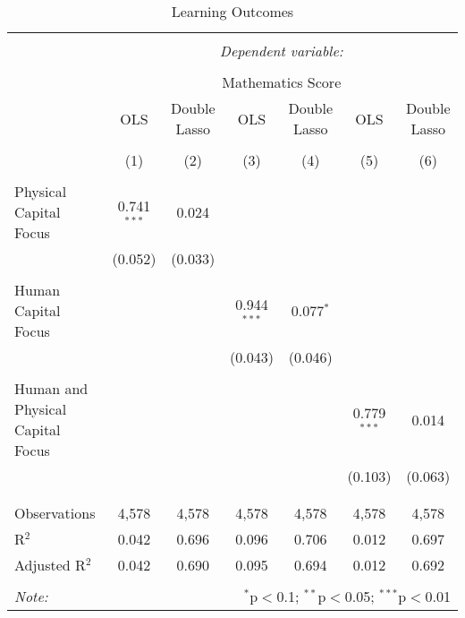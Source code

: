 
\begin{table}[!htbp] \centering 
  \caption{Learning Outcomes} 
  \label{} 
\begin{tabular}{@{\extracolsep{5pt}}lcccccc} 
\\[-1.8ex]\hline 
\hline \\[-1.8ex] 
 & \multicolumn{6}{c}{\textit{Dependent variable:}} \\ 
\cline{2-7} 
\\[-1.8ex] & \multicolumn{6}{c}{Mathematics Score} \\ 
 & OLS & Double Lasso & OLS & Double Lasso & OLS & Double Lasso \\ 
\\[-1.8ex] & (1) & (2) & (3) & (4) & (5) & (6)\\ 
\hline \\[-1.8ex] 
 Physical Capital Focus & 0.741$^{***}$ & 0.024 &  &  &  &  \\ 
  & (0.052) & (0.033) &  &  &  &  \\ 
  & & & & & & \\ 
 Human Capital Focus &  &  & 0.944$^{***}$ & 0.077$^{*}$ &  &  \\ 
  &  &  & (0.043) & (0.046) &  &  \\ 
  & & & & & & \\ 
 Human and Physical Capital Focus &  &  &  &  & 0.779$^{***}$ & 0.014 \\ 
  &  &  &  &  & (0.103) & (0.063) \\ 
  & & & & & & \\ 
\hline \\[-1.8ex] 
Observations & 4,578 & 4,578 & 4,578 & 4,578 & 4,578 & 4,578 \\ 
R$^{2}$ & 0.042 & 0.696 & 0.096 & 0.706 & 0.012 & 0.697 \\ 
Adjusted R$^{2}$ & 0.042 & 0.690 & 0.095 & 0.694 & 0.012 & 0.692 \\ 
\hline 
\hline \\[-1.8ex] 
\textit{Note:}  & \multicolumn{6}{r}{$^{*}$p$<$0.1; $^{**}$p$<$0.05; $^{***}$p$<$0.01} \\ 
\end{tabular} 
\end{table} 
